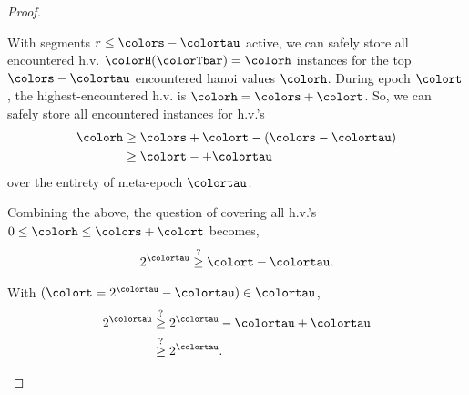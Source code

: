 \begin{proof}
\begin{proofpart}
With segments $r \leq \colors - \colortau$ active, we can safely store all encountered h.v. $\colorH(\colorTbar) = \colorh$ instances for the top $\colors - \colortau$ encountered hanoi values $\colorh$.
During epoch $\colort$, the highest-encountered h.v. is $\colorh=\colors + \colort$.
So, we can safely store all encountered instances for h.v.'s
\begin{align*}
\colorh
&\geq
\colors + \colort - (\colors - \colortau)\\
&\geq
\colort -+ \colortau
\end{align*}
over the entirety of meta-epoch $\colortau$.
\end{proofpart}

\begin{proofpart}
Combining the above, the question of covering all h.v.'s $0\leq\colorh\leq\colors+\colort$ becomes,
\begin{align*}
2^{\colortau}
\stackrel{?}{\geq} \colort - \colortau.
\end{align*}

With $(\colort = 2^{\colortau} - \colortau) \in \colortau$,
\begin{align*}
2^{\colortau}
&\stackrel{?}{\geq} 2^{\colortau} - \colortau + \colortau \\
&\stackrel{?}{\geq} 2^{\colortau}.
\end{align*}
\end{proofpart}

\end{proof}
